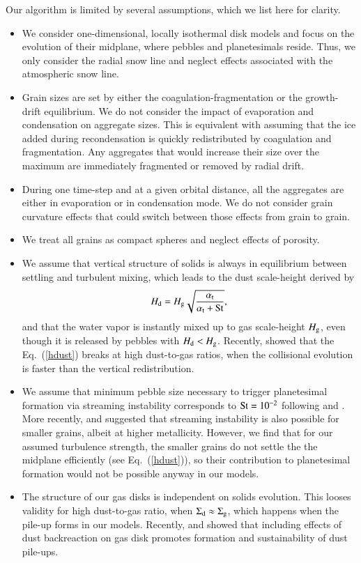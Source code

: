\documentclass{aa}
\begin{document}
Our algorithm is limited by several assumptions, which we list here for clarity.
\begin{itemize}
\item{We consider one-dimensional, locally isothermal disk models and focus on the evolution of their midplane, where pebbles and planetesimals reside. Thus, we only consider the radial snow line and neglect effects associated with the atmospheric snow line.}
\item{Grain sizes are set by either the coagulation-fragmentation or the growth-drift equilibrium. We do not consider the impact of evaporation and condensation on aggregate sizes. This is equivalent with assuming that the ice added during recondensation is quickly redistributed by coagulation and fragmentation. Any aggregates that would increase their size over the maximum are immediately fragmented or removed by radial drift.}
\item{During one time-step and at a given orbital distance, all the aggregates are either in evaporation or in condensation mode. We do not consider grain curvature effects that could switch between those effects from grain to grain.  }
\item{We treat all grains as compact spheres and neglect effects of porosity.}
\item{We assume that vertical structure of solids is always in equilibrium between settling and turbulent mixing, which leads to the dust scale-height derived by \citet{1995Icar..114..237D}
\begin{equation}\label{hdust}
H_{\rm d} = H_{\rm g} \sqrt{\frac{\alpha_{\rm t}}{\alpha_{\rm t} + {\rm St}}},
\end{equation}
and that the water vapor is instantly mixed up to gas scale-height $H_{\rm g}$, even though it is released by pebbles with $H_{\rm d} < H_{\rm g}$. Recently, \citet{2016ApJ...833..285K} showed that the Eq.~(\ref{hdust}) breaks at high dust-to-gas ratios, when the collisional evolution is faster than the vertical redistribution.}
\item{We assume that minimum pebble size necessary to trigger planetesimal formation via streaming instability corresponds to $\rm{St}=10^{-2}$ following \citet{2010ApJ...722.1437B} and \citet{2014A&A...572A..78D}. More recently, \citet{2015A&A...579A..43C} and \citet{2016arXiv161107014Y} suggested that streaming instability is also possible for smaller grains, albeit at higher metallicity. However, we find that for our assumed turbulence strength, the smaller grains do not settle the the midplane efficiently (see Eq.~(\ref{hdust})), so their contribution to planetesimal formation would not be possible anyway in our models.}
\item{The structure of our gas disks is independent on solids evolution. This looses validity for high dust-to-gas ratio, when $\Sigma_{\rm d} \approx \Sigma_{\rm g}$, which happens when the pile-up forms in our models. Recently, \citet{2017MNRAS.467.1984G} and \citet{2017ApJ...844..142K} showed that including effects of dust backreaction on gas disk promotes formation and sustainability of dust pile-ups.}
\end{itemize}
\end{document}
